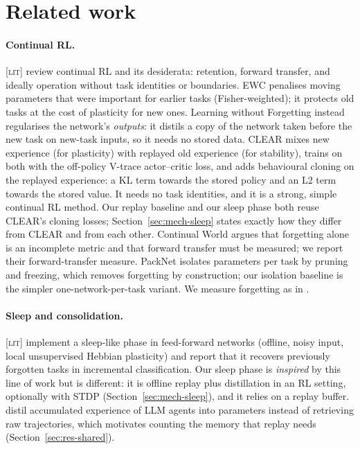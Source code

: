 \documentclass[10pt]{article}
\newcommand{\lit}{\textsc{[lit]}\xspace}
\begin{document}
\section{Related work}
\label{sec:related}

\paragraph{Continual RL.} \lit \citet{khetarpal2022towards} review continual RL and its desiderata: retention,
forward transfer, and ideally operation without task identities or boundaries. EWC \citep{kirkpatrick2017overcoming}
penalises moving parameters that were important for earlier tasks (Fisher-weighted); it protects old tasks at the
cost of plasticity for new ones. Learning without Forgetting \citep[LwF;][]{li2017learning} instead regularises the
network's \emph{outputs}: it distils a copy of the network taken before the new task on new-task inputs, so it needs
no stored data. CLEAR \citep{rolnick2019experience} mixes new experience (for plasticity) with
replayed old experience (for stability), trains on both with the off-policy V-trace actor--critic loss, and adds
behavioural cloning on the replayed experience: a KL term towards the stored policy and an L2 term towards the stored
value. It needs no task identities, and it is a strong, simple continual RL method. Our replay baseline and our sleep
phase both reuse CLEAR's cloning losses; Section~\ref{sec:mech-sleep} states exactly how they differ from CLEAR and
from each other.
Continual World \citep{wolczyk2021continual} argues that forgetting alone is an incomplete metric and that forward
transfer must be measured; we report their forward-transfer measure. PackNet \citep{mallya2018packnet} isolates
parameters per task by pruning and freezing, which removes forgetting by construction; our isolation baseline is
the simpler one-network-per-task variant. We measure forgetting as in \citet{chaudhry2018riemannian}.

\paragraph{Sleep and consolidation.} \lit \citet{tadros2022sleep} implement a sleep-like phase in feed-forward
networks (offline, noisy input, local unsupervised Hebbian plasticity) and report that it recovers previously
forgotten tasks in incremental classification. Our sleep phase is \emph{inspired} by this line of work but is
different: it is offline replay plus distillation in an RL setting, optionally with STDP (Section~\ref{sec:mech-sleep}),
and it relies on a replay buffer. \citet{yu2025selfconsolidation} distil accumulated experience of LLM agents into
parameters instead of retrieving raw trajectories, which motivates counting the memory that replay needs
(Section~\ref{sec:res-shared}).
\end{document}

